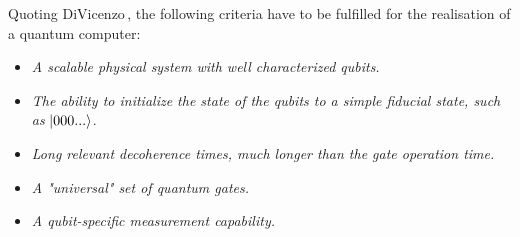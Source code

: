 Quoting DiVicenzo\,\cite{Divincenzo2000TheComputation}, the following criteria have to be fulfilled for the realisation of a quantum computer:
\begin{displayquote}
\begin{itemize}
    \item \textit{A scalable physical system with well characterized qubits.}
    \item \textit{The ability to initialize the state of the qubits to a simple fiducial state, such as} $\ket{000...}$.
    \item \textit{Long relevant decoherence times, much longer than the gate operation time.}
    \item \textit{A "universal" set of quantum gates.}
    \item \textit{A qubit-specific measurement capability.}
\end{itemize}
\end{displayquote}
